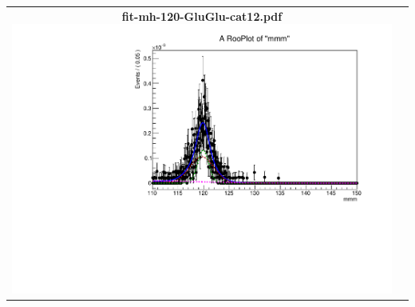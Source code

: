 \begin{longtable}{|c|c|}
{}
 \\
\hline
\parbox{0.49\textwidth}{
\centering
{\bfseries fit-mh-120-GluGlu-cat12.pdf}
\includegraphics[width=.49\textwidth]{figures/signal_model/AppendixBdt/GluGlu/120/fit_mh_120_GluGlu_cat12.pdf}
}
 & \\ \hline
\end{longtable}
